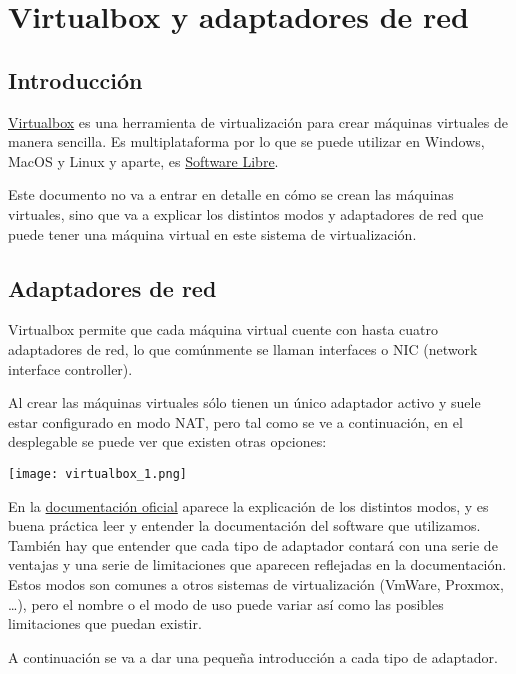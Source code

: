 \chapter{Virtualbox y adaptadores de red}

\section{Introducción}
\href{https://www.virtualbox.org/}{Virtualbox} es una herramienta de virtualización para crear máquinas virtuales de manera sencilla. Es multiplataforma por lo que se puede utilizar en Windows, MacOS y Linux y aparte, es \hyperlink{software_libre}{Software Libre}.

Este documento no va a entrar en detalle en cómo se crean las máquinas virtuales, sino que va a explicar los distintos modos y adaptadores de red que puede tener una máquina virtual en este sistema de virtualización.

\section{Adaptadores de red}
Virtualbox permite que cada máquina virtual cuente con hasta cuatro adaptadores de red, lo que comúnmente se llaman interfaces o NIC (network interface controller).

Al crear las máquinas virtuales sólo tienen un único adaptador activo y suele estar configurado en modo NAT, pero tal como se ve a continuación, en el desplegable se puede ver que existen otras opciones:

\begin{center}
    \vspace{-10pt}
    \texttt{[image: virtualbox\_1.png]}
    \vspace{-20pt}
\end{center}

En la \href{https://www.virtualbox.org/manual/ch06.html}{documentación oficial} aparece la explicación de los distintos modos, y es buena práctica leer y entender la documentación del software que utilizamos. También hay que entender que cada tipo de adaptador contará con una serie de ventajas y una serie de limitaciones que aparecen reflejadas en la documentación. Estos modos son comunes a otros  sistemas de virtualización (VmWare, Proxmox, …), pero el nombre o el modo de uso puede variar así como las posibles limitaciones que puedan existir.

A continuación se va a dar una pequeña introducción a cada tipo de adaptador.

